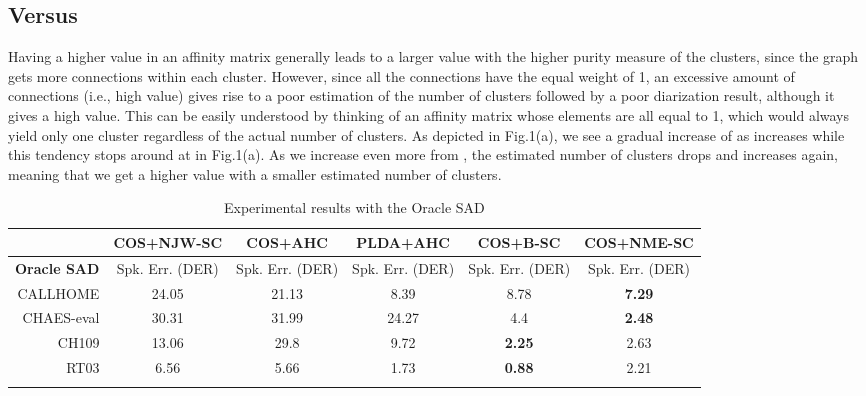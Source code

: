 \documentclass[journal]{IEEEtran}
\begin{document}
\subsection{ Versus }
Having a higher  value in an affinity matrix  generally leads to a larger  value with the higher purity measure of the clusters, since the graph gets more connections within each cluster. However, since all the connections have the equal weight of 1, an excessive amount of connections (i.e., high  value) gives rise to a poor estimation of the number of clusters followed by a poor diarization result, although it gives a high  value. This can be easily understood by thinking of an affinity matrix whose elements are all equal to 1, which would always yield only one cluster regardless of the actual number of clusters. As depicted in Fig.1(a), we see a gradual increase of  as  increases while this tendency stops around at  in Fig.1(a). As we increase  even more from , the estimated number of clusters drops and  increases again, meaning that we get a higher  value with a smaller estimated number of clusters.   
\begin{table*}[t]
\caption{Experimental results with the Oracle SAD}
\vspace{-3.0ex}
\small
\label{tab:oracle_SAD}
\begin{center}
 \begin{tabular}{ r | c | c | c | c | c }
\Xhline{3\arrayrulewidth}
 & COS+NJW-SC  & COS+AHC & PLDA+AHC & COS+B-SC & COS+NME-SC  \\
 \hline
\textbf{Oracle SAD} & Spk. Err. (DER) & Spk. Err. (DER) & Spk. Err. (DER) & Spk. Err. (DER) &  Spk. Err. (DER) \\
\Xhline{3\arrayrulewidth}
CALLHOME & 24.05 & 21.13 & 8.39 & 8.78 & \textbf{7.29} \\ 
CHAES-eval & 30.31 & 31.99 &24.27 & 4.4  & \textbf{2.48}  \\
CH109 & 13.06 & 29.8 &9.72  & \textbf{2.25} & 2.63 \\
RT03& 6.56 & 5.66 & 1.73  & \textbf{0.88} & 2.21 \\
 \Xhline{3\arrayrulewidth}
\end{tabular}
\end{center}
\vspace{-3.0ex}
\end{table*}
\end{document}
